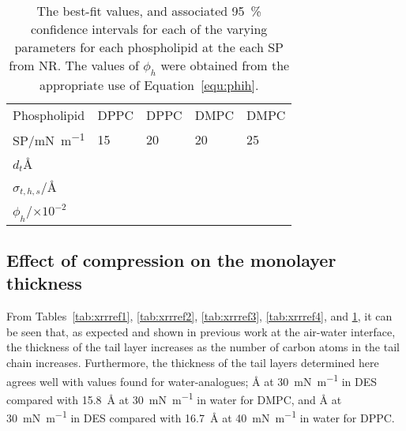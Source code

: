\begin{table}[t]
    \forceversofloat
    \centering
    \small
    \caption{The best-fit values, and associated \SI{95}{\percent} confidence intervals for each of the varying parameters for each phospholipid at the each SP from NR. The values of $\phi_h$ were obtained from the appropriate use of Equation~\protect\ref{equ:phih}.}
    \label{tab:nrref}
    \begin{tabular}{l | l l l l}
        \toprule
        Phospholipid & DPPC & DPPC & DMPC & DMPC \\
        SP/\si{\milli\newton\per\meter} & 15 & 20 & 20 & 25 \\
        \midrule
        $d_t$\si{\angstrom} &  &  &  &  \\
        $\sigma_{t,h,s}$/\si{\angstrom} &  &  &  &  \\
        \midrule
        $\phi_h$/$\times 10^{-2}$ &  &  &  &  \\
        \bottomrule
    \end{tabular}
\end{table}
%

\subsection{Effect of compression on the monolayer thickness}
From Tables~\ref{tab:xrrref1}, \ref{tab:xrrref2}, \ref{tab:xrrref3}, \ref{tab:xrrref4}, and \ref{tab:nrref}, it can be seen that, as expected and shown in previous work at the air-water interface,\autocite{mohwald_phospholipid_1990,vaknin_structural_1991} the thickness of the tail layer increases as the number of carbon atoms in the tail chain increases.
Furthermore, the thickness of the tail layers determined here agrees well with values found for water-analogues; \si{\angstrom} at \SI{30}{\milli\newton\per\meter} in DES compared with \SI{15.8}{\angstrom} at \SI{30}{\milli\newton\per\meter} in water for DMPC, and \si{\angstrom} at \SI{30}{\milli\newton\per\meter} in DES compared with \SI{16.7}{\angstrom} at \SI{40}{\milli\newton\per\meter} in water for DPPC.


